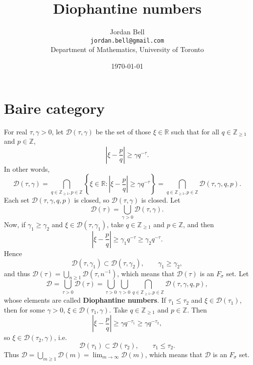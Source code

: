 \documentclass{article}
\theoremstyle{definition}
\begin{document}
\title{Diophantine numbers}
\author{Jordan Bell\\ \texttt{jordan.bell@gmail.com}\\Department of Mathematics, University of Toronto}
\date{\today}

\maketitle

\section{Baire category}
For real $\tau,\gamma>0$,
let $\mathcal{D}(\tau,\gamma)$ be the set of those $\xi \in \mathbb{R}$ such that for all $q \in \mathbb{Z}_{\geq 1}$
and $p \in \mathbb{Z}$,
\[
\left|\xi-\frac{p}{q}\right| \geq \gamma q^{-\tau}.
\]
In other words, 
\[
\mathcal{D}(\tau,\gamma) =  \bigcap_{q \in \mathbb{Z}_{\geq 1}, p \in \mathbb{Z}} \left\{\xi \in \mathbb{R}:
\left|\xi-\frac{p}{q}\right| \geq \gamma q^{-\tau}\right\}
= \bigcap_{q \in \mathbb{Z}_{\geq 1}, p \in \mathbb{Z}} \mathcal{D}(\tau,\gamma,q,p).
\]
Each set $\mathcal{D}(\tau,\gamma,q,p)$ is closed, so $\mathcal{D}(\tau,\gamma)$ is closed.
Let
\[
\mathcal{D}(\tau) = \bigcup_{\gamma>0} \mathcal{D}(\tau,\gamma).
\]
Now, if $\gamma_1 \geq \gamma_2$ and $\xi \in \mathcal{D}(\tau,\gamma_1)$, take $q \in \mathbb{Z}_{\geq 1}$ and
$p \in \mathbb{Z}$, and then
\[
\left|\xi-\frac{p}{q}\right| \geq \gamma_1 q^{-\tau} \geq  \gamma_2 q^{-\tau}.
\]
Hence
\[
\mathcal{D}(\tau,\gamma_1) \subset \mathcal{D}(\tau,\gamma_2),\qquad \gamma_1 \geq \gamma_2,
\]
and thus
$\mathcal{D}(\tau) = \bigcup_{n \geq 1} \mathcal{D}(\tau,n^{-1})$,
which means that $\mathcal{D}(\tau)$ is an $F_\sigma$ set. 
Let
\[
\mathcal{D} = \bigcup_{\tau>0} \mathcal{D}(\tau)
=\bigcup_{\tau>0} \bigcup_{\gamma>0} \bigcap_{q \in \mathbb{Z}_{\geq 1}, p \in \mathbb{Z}} \mathcal{D}(\tau,
\gamma,q,p),
\]
whose elements are called \textbf{Diophantine numbers}.
If $\tau_1 \leq \tau_2$ and $\xi \in \mathcal{D}(\tau_1)$, then 
for some $\gamma>0$, $\xi \in \mathcal{D}(\tau_1,\gamma)$. 
Take $q \in \mathbb{Z}_{\geq 1}$ and
$p \in \mathbb{Z}$. Then
\[
\left|\xi-\frac{p}{q}\right| \geq \gamma q^{-\tau_1} \geq \gamma q^{-\tau_2},
\]
so $\xi \in \mathcal{D}(\tau_2,\gamma)$, i.e.
\[
\mathcal{D}(\tau_1) \subset \mathcal{D}(\tau_2),\qquad \tau_1 \leq \tau_2.
\]
Thus
$\mathcal{D} = \bigcup_{m \geq 1} \mathcal{D}(m) = \lim_{m \to \infty} \mathcal{D}(m)$,
which means that $\mathcal{D}$ is an $F_{\sigma}$ set.
\end{document}
